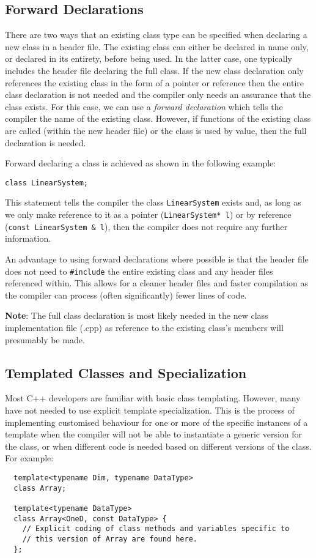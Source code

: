 \subsection{Forward Declarations}
There are two ways that an existing class
type can be specified when declaring a new class in a header file.  The
existing class can either be declared in name only, or declared in its entirety, before being used. In the latter case, one typically includes the header file declaring the full class. If the new class declaration only references the existing class in the form of a pointer or reference then the entire class declaration is not needed and the compiler only needs an assurance that the class exists. For this case, we can use a \emph{forward declaration} which tells the compiler the name of the existing class. 
However, if functions of the existing class are called (within the new header file) or the class is used by value, then the full declaration is needed.

Forward declaring a class is achieved as shown in the following example:
\begin{lstlisting}
class LinearSystem;
\end{lstlisting}
This statement tells the compiler the class \lstinline{LinearSystem} exists and, as long as we only make reference to it as a pointer (\lstinline{LinearSystem* l}) or by reference (\lstinline{const LinearSystem & l}), then the compiler does not require any further information.

An advantage to using forward declarations where possible is that the header file does not need to \lstinline{#include} the entire existing class and any header files referenced within.  This allows for a
cleaner header files and faster compilation as the compiler can process (often significantly) fewer lines of code.

\textbf{Note}: The full class declaration is most likely needed in the new class implementation file (.cpp) as reference to the existing class's members will presumably be made.
  
\subsection{Templated Classes and Specialization}
Most C++ developers are
familiar with basic class templating.  However, many have not needed
to use explicit template specialization.  This is the process of
implementing customised behaviour for one or more of the specific instances of a template when
the compiler will not be able to instantiate a generic version for
the class, or when different code is needed based on different
versions of the class.  For example:
\begin{lstlisting}
  template<typename Dim, typename DataType> 
  class Array;
  
  template<typename DataType>
  class Array<OneD, const DataType> {
    // Explicit coding of class methods and variables specific to
    // this version of Array are found here.
  };
\end{lstlisting}

